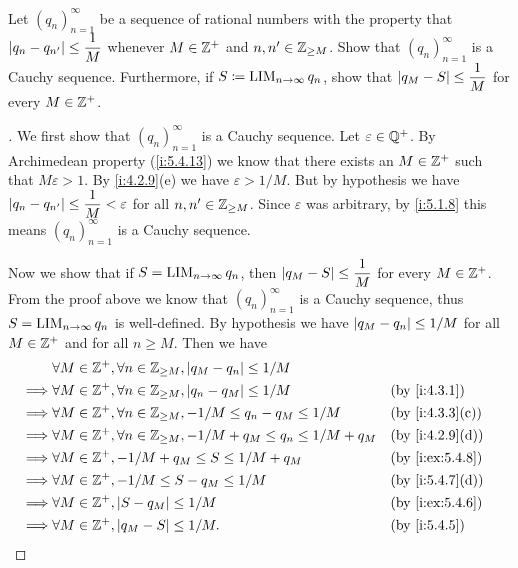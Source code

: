 \begin{ex}\label{i:ex:5.5.4}
  Let \((q_n)_{n = 1}^\infty\) be a sequence of rational numbers with the property that \(\left\lvert q_n - q_{n'}\right\rvert \leq \dfrac{1}{M}\) whenever \(M \in \mathbb{Z}^+\) and \(n, n' \in \mathbb{Z}_{\geq M}\).
  Show that \((q_n)_{n = 1}^\infty\) is a Cauchy sequence.
  Furthermore, if \(S \coloneqq \operatorname*{LIM}_{n \to \infty} q_n\), show that \(\left\lvert q_M - S\right\rvert \leq \dfrac{1}{M}\) for every \(M \in \mathbb{Z}^+\).
\end{ex}

\begin{proof}[]
  We first show that \((q_n)_{n = 1}^\infty\) is a Cauchy sequence.
  Let \(\varepsilon \in \mathbb{Q}^+\).
  By Archimedean property (\cref{i:5.4.13}) we know that there exists an \(M \in \mathbb{Z}^+\) such that \(M \varepsilon > 1\).
  By \cref{i:4.2.9}(e) we have \(\varepsilon > 1 / M\).
  But by hypothesis we have \(\left\lvert q_n - q_{n'}\right\rvert \leq \dfrac{1}{M} < \varepsilon\) for all \(n, n' \in \mathbb{Z}_{\geq M}\).
  Since \(\varepsilon\) was arbitrary, by \cref{i:5.1.8} this means \((q_n)_{n = 1}^{\infty}\) is a Cauchy sequence.

  Now we show that if \(S = \operatorname*{LIM}_{n \to \infty} q_n\), then \(\left\lvert q_M - S\right\rvert \leq \dfrac{1}{M}\) for every \(M \in \mathbb{Z}^+\).
  From the proof above we know that \((q_n)_{n = 1}^\infty\) is a Cauchy sequence, thus \(S = \operatorname*{LIM}_{n \to \infty} q_n\) is well-defined.
  By hypothesis we have \(\left\lvert q_M - q_n\right\rvert \leq 1 / M\) for all \(M \in \mathbb{Z}^+\) and for all \(n \geq M\).
  Then we have
  \begin{align*}
             & \forall M \in \Z^+, \forall n \in \Z_{\geq M}, \abs{q_M - q_n} \leq 1 / M                                  \\
    \implies & \forall M \in \Z^+, \forall n \in \Z_{\geq M}, \abs{q_n - q_M} \leq 1 / M             &  & \by{i:4.3.1}    \\
    \implies & \forall M \in \Z^+, \forall n \in \Z_{\geq M}, -1 / M \leq q_n - q_M \leq 1 / M       &  & \by{i:4.3.3}[c] \\
    \implies & \forall M \in \Z^+, \forall n \in \Z_{\geq M}, -1 / M + q_M \leq q_n \leq 1 / M + q_M &  & \by{i:4.2.9}[d] \\
    \implies & \forall M \in \Z^+, -1 / M + q_M \leq S \leq 1 / M + q_M                              &  & \by{i:ex:5.4.8} \\
    \implies & \forall M \in \Z^+, -1 / M \leq S - q_M \leq 1 / M                                    &  & \by{i:5.4.7}[d] \\
    \implies & \forall M \in \Z^+, \abs{S - q_M} \leq 1 / M                                          &  & \by{i:ex:5.4.6} \\
    \implies & \forall M \in \Z^+, \abs{q_M - S} \leq 1 / M.                                         &  & \by{i:5.4.5}
  \end{align*}
\end{proof}

